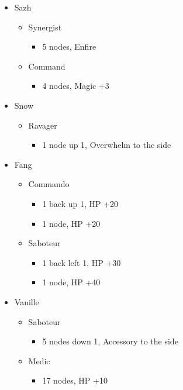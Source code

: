 \documentclass{report}
\begin{document}
\begin{menu}
\begin{itemize}
    \crystarium
    \begin{itemize}
        \item Sazh
        \begin{itemize}
            \item Synergist
            \begin{itemize}
                \item 5 nodes, Enfire
            \end{itemize}
            \item Command
            \begin{itemize}
                \item 4 nodes, Magic +3
            \end{itemize}
        \end{itemize}
        \item Snow
        \begin{itemize}
            \item Ravager
            \begin{itemize}
                \item 1 node up 1, Overwhelm to the side
            \end{itemize}
        \end{itemize}
        \item Fang
        \begin{itemize}
            \item Commando
            \begin{itemize}
                \item 1 back up 1, HP +20
                \item 1 node, HP +20
            \end{itemize}
            \item Saboteur
            \begin{itemize}
                \item 1 back left 1, HP +30
                \item 1 node, HP +40
            \end{itemize}
        \end{itemize}
        \item Vanille
        \begin{itemize}
            \item Saboteur
            \begin{itemize}
                \item 5 nodes down 1, Accessory to the side
            \end{itemize}
            \item Medic
            \begin{itemize}
                \item 17 nodes, HP +10
            \end{itemize}
        \end{itemize}
    \end{itemize}
    
\end{itemize}
\end{menu}
\end{document}
